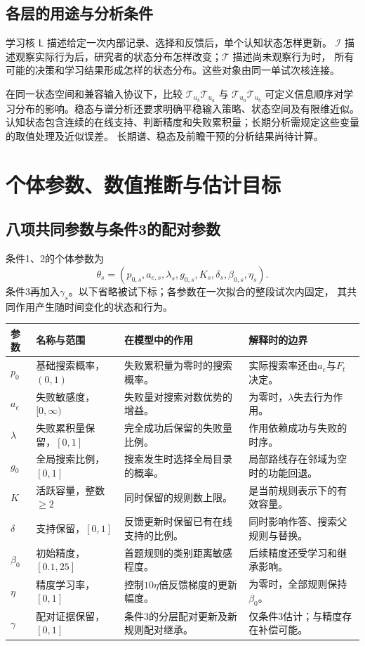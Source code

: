 \documentclass[11pt,a4paper]{article}
\numberwithin{equation}{section}
\newcommand{\Ll}{\mathsf{L}}
\newcommand{\Ii}{\mathcal{I}}
\newcommand{\Tt}{\mathcal{T}}
\begin{document}
\subsection{各层的用途与分析条件}
学习核 $\Ll$ 描述给定一次内部记录、选择和反馈后，单个认知状态怎样更新。
$\Ii$ 描述观察实际行为后，研究者的状态分布怎样改变；$\Tt$ 描述尚未观察行为时，
所有可能的决策和学习结果形成怎样的状态分布。这些对象由同一单试次核连接。

在同一状态空间和兼容输入协议下，比较 $\Tt_{u_b}\Tt_{u_a}$ 与 $\Tt_{u_a}\Tt_{u_b}$
可定义信息顺序对学习分布的影响。稳态与谱分析还要求明确平稳输入策略、状态空间及有限维近似。
认知状态包含连续的在线支持、判断精度和失败累积量；长期分析需规定这些变量的取值处理及近似误差。
长期谱、稳态及前瞻干预的分析结果尚待计算。

\section{个体参数、数值推断与估计目标}
\label{sec:inference}

\subsection{八项共同参数与条件3的配对参数}
\label{sec:parameters}
条件1、2的个体参数为
\begin{equation}
\theta_s=(p_{0,s},a_{e,s},\lambda_s,g_{0,s},K_s,\delta_s,\beta_{0,s},\eta_s).
\label{eq:parameters}
\end{equation}
条件3再加入$\gamma_s$。以下省略被试下标；各参数在一次拟合的整段试次内固定，
其共同作用产生随时间变化的状态和行为。

{\small
\begin{longtable}{L{1.3cm}L{3.0cm}L{5.2cm}L{4.7cm}}
\toprule
参数 & 名称与范围 & 在模型中的作用 & 解释时的边界\\
\midrule\endhead
$p_0$ & 基础搜索概率，$(0,1)$ & 失败累积量为零时的搜索概率。 & 实际搜索率还由$a_e$与$F_t$决定。\\
$a_e$ & 失败敏感度，$[0,\infty)$ & 失败量对搜索对数优势的增益。 & 为零时，$\lambda$失去行为作用。\\
$\lambda$ & 失败累积量保留，$[0,1]$ & 完全成功后保留的失败量比例。 & 作用依赖成功与失败的时序。\\
$g_0$ & 全局搜索比例，$[0,1]$ & 搜索发生时选择全局目录的概率。 & 局部路线存在邻域为空时的功能回退。\\
$K$ & 活跃容量，整数$\geq2$ & 同时保留的规则数上限。 & 是当前规则表示下的有效容量。\\
$\delta$ & 支持保留，$[0,1]$ & 反馈更新时保留已有在线支持的比例。 & 同时影响作答、搜索父规则与替换。\\
$\beta_0$ & 初始精度，$[0.1,25]$ & 首题规则的类别距离敏感程度。 & 后续精度还受学习和继承影响。\\
$\eta$ & 精度学习率，$[0,1]$ & 控制$10\eta$倍反馈梯度的更新幅度。 & 为零时，全部规则保持$\beta_0$。\\
$\gamma$ & 配对证据保留，$[0,1]$ & 条件3的分层配对更新及新规则配对继承。 & 仅条件3估计；与精度存在补偿可能。\\
\bottomrule
\end{longtable}}
\end{document}
